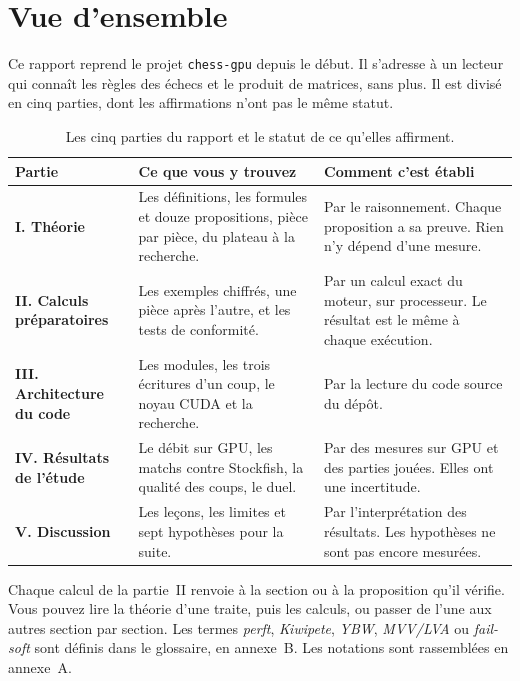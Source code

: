 \documentclass[11pt,a4paper]{article}
\newcommand{\code}[1]{\texttt{#1}}
\newcounter{calcul}
\theoremstyle{plain}
\begin{document}
\tableofcontents

\section*{Vue d'ensemble}

Ce rapport reprend le projet \code{chess-gpu} depuis le début. Il s'adresse à un lecteur qui
connaît les règles des échecs et le produit de matrices, sans plus. Il est divisé en cinq
parties, dont les affirmations n'ont pas le même statut.

\begin{table}[H]
\centering\small
\begin{tabular}{>{\raggedright\arraybackslash}p{3.1cm}>{\raggedright\arraybackslash}p{5.9cm}>{\raggedright\arraybackslash}p{5.9cm}}
\toprule
Partie & Ce que vous y trouvez & Comment c'est établi\\
\midrule
\textbf{I. Théorie} & Les définitions, les formules et douze propositions, pièce par pièce, du
plateau à la recherche. & Par le raisonnement. Chaque proposition a sa preuve. Rien n'y dépend
d'une mesure.\\
\textbf{II. Calculs préparatoires} & Les exemples chiffrés, une pièce après l'autre, et les
tests de conformité. & Par un calcul exact du moteur, sur processeur. Le résultat est le même à
chaque exécution.\\
\textbf{III. Architecture du code} & Les modules, les trois écritures d'un coup, le noyau CUDA
et la recherche. & Par la lecture du code source du dépôt.\\
\textbf{IV. Résultats de l'étude} & Le débit sur GPU, les matchs contre Stockfish, la qualité
des coups, le duel. & Par des mesures sur GPU et des parties jouées. Elles ont une incertitude.\\
\textbf{V. Discussion} & Les leçons, les limites et sept hypothèses pour la suite. & Par
l'interprétation des résultats. Les hypothèses ne sont pas encore mesurées.\\
\bottomrule
\end{tabular}
\caption{Les cinq parties du rapport et le statut de ce qu'elles affirment.}
\end{table}

\begin{note}
Chaque calcul de la partie~II renvoie à la section ou à la proposition qu'il vérifie. Vous pouvez
lire la théorie d'une traite, puis les calculs, ou passer de l'une aux autres section par section.
Les termes \emph{perft}, \emph{Kiwipete}, \emph{YBW}, \emph{MVV/LVA} ou \emph{fail-soft} sont
définis dans le glossaire, en annexe~B. Les notations sont rassemblées en annexe~A.
\end{note}
\end{document}
